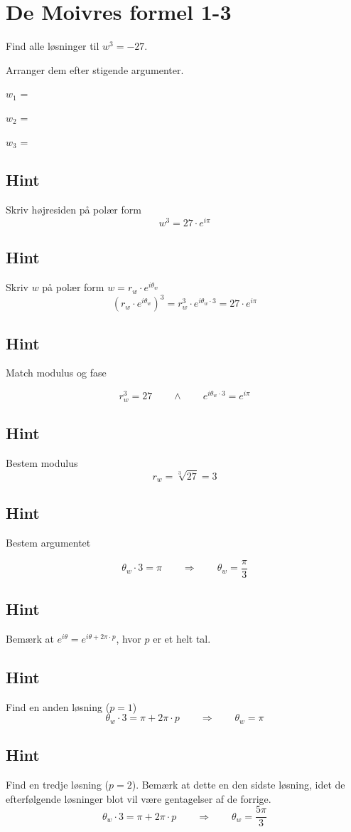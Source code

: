 \documentclass{article}
\newenvironment{exercise}[1]{\newpage\section{#1}}{}
\newcommand{\answerbox}[1]{\fbox{$#1$}}
\newcommand{\hint}{\subsection*{Hint}}
\begin{document}
\begin{exercise}{De Moivres formel 1-3}

Find alle løsninger til $w^3=-27$. 

Arranger dem efter stigende argumenter.

$w_1$ = \answerbox{3 \cdot e^{i \frac{\pi}{3}}}		

$w_2$ = \answerbox{3 \cdot e^{i \pi}}		

$w_3$ = \answerbox{3 \cdot e^{i \frac{5 \pi}{3}}}	


\hint 

Skriv højresiden på polær form
\[
w^3 = 27 \cdot e^{i \pi}
\]


\hint

Skriv $w$ på polær form $w = r_w \cdot e^{i \theta_w}$
\[
\left(r_w \cdot e^{i \theta_w}\right)^3 = r_w^3 \cdot e^{i \theta_w \cdot 3} = 27 \cdot e^{i \pi}
\]

\hint 
Match modulus og fase

\[
r_w^3 = 27 \qquad \wedge \qquad e^{i \theta_w \cdot 3} = e^{i \pi}
\]

\hint

Bestem modulus
\[
r_w  =  \sqrt[3]{27} = 3
\]

\hint

Bestem argumentet

\[
\theta_w \cdot 3 = \pi \qquad \Rightarrow \qquad  \theta_w = \frac{\pi}{3}
\]

\hint

Bemærk at $e^{i \theta} = e^{i \theta + 2 \pi \cdot p}$, hvor $p$ er et helt tal.

\hint

Find en anden løsning ($p=1$)
\[
\theta_w \cdot 3 = \pi  + 2 \pi \cdot p \qquad \Rightarrow \qquad  \theta_w = \pi
\]

\hint

Find en tredje løsning ($p=2$). 
Bemærk at dette en den sidste løsning, idet de efterfølgende 
løsninger blot vil være gentagelser af de forrige.
\[
\theta_w \cdot 3 = \pi  + 2 \pi \cdot p \qquad \Rightarrow  \qquad  \theta_w = \frac{5 \pi}{3}
\]


\end{exercise}

\newpage
\end{document}
